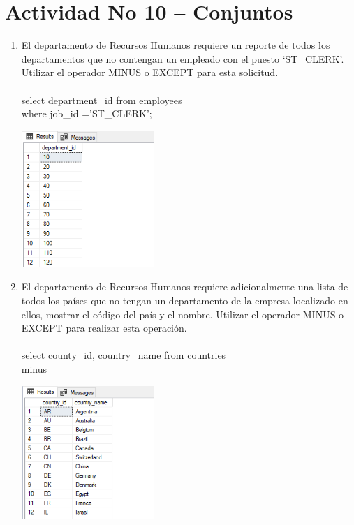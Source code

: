 \section{Actividad No 10 – Conjuntos} 
		


\begin{enumerate}[1.]
	\item El departamento de Recursos Humanos requiere un reporte de todos los departamentos que no contengan un empleado con el puesto ‘ST\_CLERK’. Utilizar el operador MINUS o EXCEPT para esta solicitud.
	\\
	\\select department\_id from employees
	\\where job\_id ='ST\_CLERK';

	\begin{center}
	\includegraphics[width=5cm]{./Imagenes/ejercicio10-1} 
	\end{center}

	\item El departamento de Recursos Humanos requiere adicionalmente una lista de todos los pa\'ises que no tengan un departamento de la empresa localizado en ellos, mostrar el código del país y el nombre. Utilizar el operador MINUS o EXCEPT para realizar esta operaci\'on.
	\\
	\\select county\_id, country\_name from countries
	\\minus

	\begin{center}
	\includegraphics[width=5cm]{./Imagenes/ejercicio10-2} 
	\end{center}


\end{enumerate}
